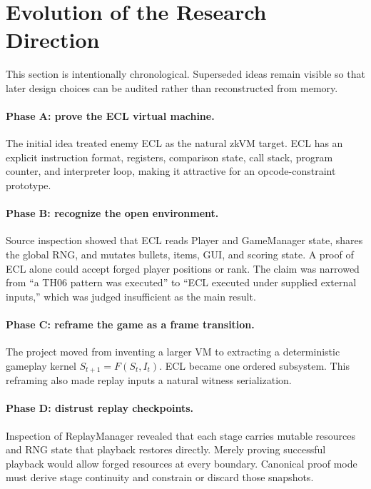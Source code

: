 \section{Evolution of the Research Direction}

This section is intentionally chronological.  Superseded ideas remain visible
so that later design choices can be audited rather than reconstructed from
memory.

\paragraph{Phase A: prove the ECL virtual machine.}
The initial idea treated enemy ECL as the natural zkVM target.  ECL has an
explicit instruction format, registers, comparison state, call stack, program
counter, and interpreter loop, making it attractive for an opcode-constraint
prototype.

\paragraph{Phase B: recognize the open environment.}
Source inspection showed that ECL reads Player and GameManager state, shares the
global RNG, and mutates bullets, items, GUI, and scoring state.  A proof of ECL
alone could accept forged player positions or rank.  The claim was narrowed
from ``a TH06 pattern was executed'' to ``ECL executed under supplied external
inputs,'' which was judged insufficient as the main result.

\paragraph{Phase C: reframe the game as a frame transition.}
The project moved from inventing a larger VM to extracting a deterministic
gameplay kernel $S_{t+1}=F(S_t,I_t)$.  ECL became one ordered subsystem.  This
reframing also made replay inputs a natural witness serialization.

\paragraph{Phase D: distrust replay checkpoints.}
Inspection of ReplayManager revealed that each stage carries mutable resources
and RNG state that playback restores directly.  Merely proving successful
playback would allow forged resources at every boundary.  Canonical proof mode
must derive stage continuity and constrain or discard those snapshots.

